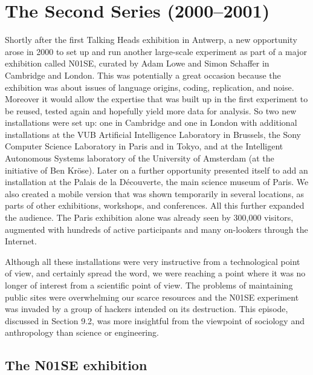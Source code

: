 \chapter{The Second Series (2000--2001)}
\label{c:n01se}

Shortly after the first Talking Heads exhibition in Antwerp, a new opportunity arose in 2000 to set up and run another
large-scale experiment as part of a major exhibition called N01SE, curated by Adam Lowe and Simon Schaffer in Cambridge
and London. This was potentially 
a great occasion because the exhibition was about issues of language origins, coding, replication, 
and noise. Moreover it would allow the expertise that was built up in the first experiment to be reused, 
tested again and hopefully yield more data for analysis. So two new installations were set up: one in 
Cambridge and one in London with additional installations at the VUB Artificial Intelligence 
Laboratory in Brussels, the Sony Computer Science Laboratory in Paris and in Tokyo, and at the 
Intelligent Autonomous Systems laboratory of the University of Amsterdam (at the initiative of Ben Kr\"{o}se). 
Later on a further opportunity presented itself to add an installation at the 
Palais de la D\'{e}couverte, the main science museum of Paris. 
We also created a mobile version that was shown temporarily in several locations, as parts of 
other exhibitions, workshops, and conferences.  All this further expanded the 
audience. The Paris exhibition alone was already seen 
by 300,000 visitors, augmented with hundreds of active participants and many on-lookers through the Internet. 

Although all these installations were very instructive from a technological point of view, and certainly spread 
the word, we were reaching a point where it was no longer of interest from a scientific point of view. The problems 
of maintaining public sites were overwhelming our scarce resources
and the N01SE experiment was invaded by a group of hackers intended
on its destruction. This episode, discussed in Section 9.2, was more insightful from the viewpoint of sociology 
and anthropology than science or engineering. 

\section{The N01SE exhibition} 

